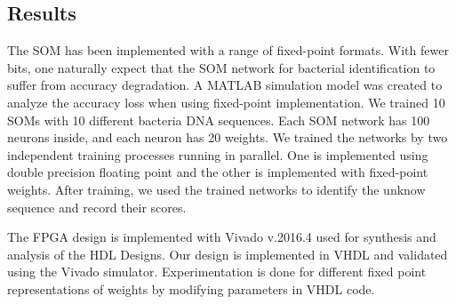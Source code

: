 \documentclass[a4paper,10pt]{article}
\begin{document}
\subsection{Results}
The SOM has been implemented with a range of fixed-point formats. With fewer bits, one naturally expect that the SOM network for bacterial identification to suffer from accuracy degradation. A MATLAB simulation model was created to analyze the accuracy loss when using fixed-point implementation. We trained 10 SOMs with 10 different bacteria DNA sequences. Each SOM network has 100 neurons inside, and each neuron has 20 weights. We trained the networks by two independent training processes running in parallel. One is implemented using double precision floating point and the other is implemented with fixed-point weights. After training, we used the trained networks to identify the unknow sequence and record their scores.

The FPGA design is implemented with Vivado v.2016.4 used for synthesis and analysis of the HDL Designs. Our design is implemented in VHDL and validated using the Vivado simulator. Experimentation is done for different fixed point representations of weights by modifying parameters in VHDL code. 
\end{document}
